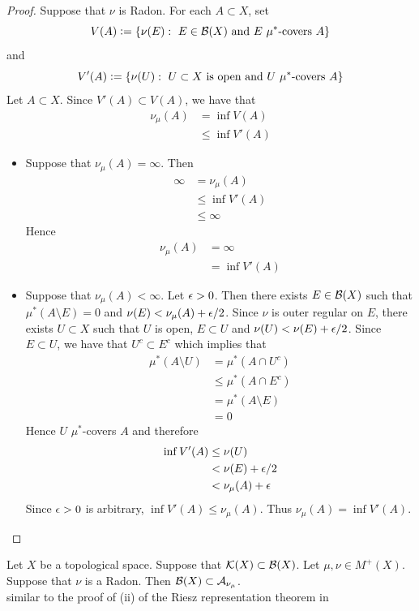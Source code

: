 \documentclass{book}
\begin{document}
	\begin{proof}
		Suppose that $\nu$ is Radon. For each $A \subset X$, set 
		$$V(A) \vcentcolon= \{\nu(E): \text{ $E \in \mathcal{B}(X)$ and $E$ $\mu^*$-covers $A$} \}$$ 
		and  
		$$V'(A) \vcentcolon= \{\nu(U): \text{ $U \subset X$ is open and $U$ $\mu^*$-covers $A$} \}$$
		Let $A \subset X$. Since $V'(A) \subset V(A)$, we have that 
		\begin{align*}
			\nu_{\mu}(A) 
			& = \inf V(A) \\
			& \leq \inf V'(A) 
		\end{align*}
		\begin{itemize}
			\item Suppose that $\nu_{\mu}(A) = \infty$. Then 
			\begin{align*}
				\infty
				& = \nu_{\mu}(A) \\
				& \leq \inf V'(A) \\
				& \leq \infty 
			\end{align*}
			Hence 
			\begin{align*}
				\nu_{\mu}(A)
				& = \infty \\
				& = \inf V'(A) 
			\end{align*}
			\item Suppose that $\nu_{\mu}(A) < \infty$. Let $\epsilon > 0$. Then there exists $E \in \mathcal{B}(X)$ such that $\mu^*(A \setminus E) = 0$ and $\nu(E) < \nu_{\mu}(A) + \epsilon/2$. Since $\nu$ is outer regular on $E$, there exists $U \subset X$ such that $U$ is open, $E \subset U$ and $\nu(U) < \nu(E) + \epsilon/2$. Since $E \subset U$, we have that $U^c \subset E^c$ which implies that 
			\begin{align*}
				\mu^*(A \setminus U)
				& = \mu^*(A \cap U^c) \\
				& \leq \mu^*(A \cap E^c) \\
				& = \mu^*(A \setminus E) \\
				& = 0
			\end{align*}
			Hence $U$ $\mu^*$-covers $A$ and therefore
			\begin{align*}
				\inf V'(A)
				& \leq \nu(U) \\
				& < \nu(E) + \epsilon/2 \\
				& < \nu_{\mu}(A) + \epsilon 
			\end{align*} 
			Since $\epsilon >0$ is arbitrary, $\inf V'(A) \leq \nu_{\mu}(A)$. Thus $\nu_{\mu}(A) = \inf V'(A)$. 
		\end{itemize}
	\end{proof}
	
	\begin{ex} 
		Let $X$ be a topological space. Suppose that $\mathcal{K}(X) \subset \mathcal{B}(X)$. Let $\mu, \nu \in M^+(X)$. Suppose that $\nu$ is a Radon. Then $\mathcal{B}(X) \subset \mathcal{A}_{\nu_{\mu}}$. \\
		 similar to the proof of (ii) of the Riesz representation theorem in ~\cite{folland1999real} 
	\end{ex}
	
\end{document}
